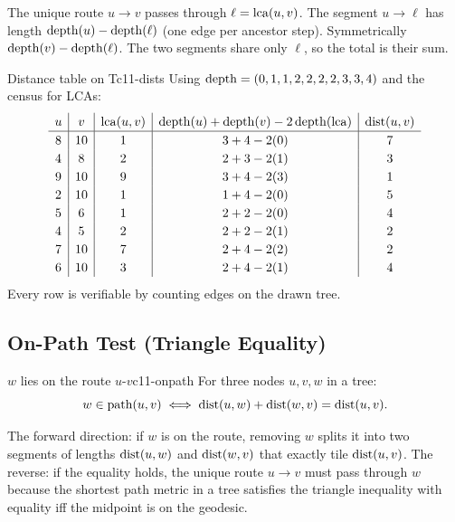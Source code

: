 \begin{proofbox}
The unique route \(u\to v\) passes through \(\ell = \operatorname{lca}(u,v)\).
The segment \(u\to\ell\) has length \(\operatorname{depth}(u)-\operatorname{depth}(\ell)\) (one edge
per ancestor step).  Symmetrically \(\operatorname{depth}(v)-\operatorname{depth}(\ell)\).  The two
segments share only \(\ell\), so the total is their sum.
\end{proofbox}

\begin{example}{Distance table on T}{c11-dists}
Using \(\operatorname{depth} = (0,1,1,2,2,2,2,3,3,4)\) and the census for LCAs:
\[
\renewcommand{\arraystretch}{1.2}
\begin{array}{c|c|c|c|c}
u & v & \lca(u,v) & \depth(u)+\depth(v)-2\depth(\lca) & \dist(u,v) \\ \hline
8  & 10 & 1 & 3+4-2(0) & 7\\
4  & 8  & 2 & 2+3-2(1) & 3\\
9  & 10 & 9 & 3+4-2(3) & 1\\
2  & 10 & 1 & 1+4-2(0) & 5\\
5  & 6  & 1 & 2+2-2(0) & 4\\
4  & 5  & 2 & 2+2-2(1) & 2\\
7  & 10 & 7 & 2+4-2(2) & 2\\
6  & 10 & 3 & 2+4-2(1) & 4
\end{array}
\]
Every row is verifiable by counting edges on the drawn tree.
\end{example}

\subsection{On-Path Test (Triangle Equality)}

\begin{proposition}{\(w\) lies on the route \(u\)-\(v\)}{c11-onpath}
For three nodes \(u, v, w\) in a tree:
\[
  w \in \text{path}(u,v) \iff \operatorname{dist}(u,w)+\operatorname{dist}(w,v) = \operatorname{dist}(u,v).
\]
\end{proposition}

\begin{proofbox}
The forward direction: if \(w\) is on the route, removing \(w\) splits it
into two segments of lengths \(\operatorname{dist}(u,w)\) and \(\operatorname{dist}(w,v)\) that
exactly tile \(\operatorname{dist}(u,v)\).  The reverse: if the equality holds, the
unique route \(u\to v\) must pass through \(w\) because the shortest path
metric in a tree satisfies the triangle inequality with equality iff the
midpoint is on the geodesic.
\end{proofbox}

